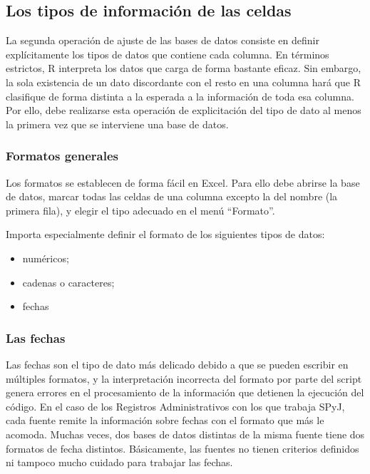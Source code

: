 \documentclass[
  spanish,
]{book}
\begin{document}
\hypertarget{los-tipos-de-informaciuxf3n-de-las-celdas}{%
\subsection{Los tipos de información de las celdas}\label{los-tipos-de-informaciuxf3n-de-las-celdas}}

La segunda operación de ajuste de las bases de datos consiste en definir explícitamente los tipos de datos que contiene cada columna. En términos estrictos, R interpreta los datos que carga de forma bastante eficaz. Sin embargo, la sola existencia de un dato discordante con el resto en una columna hará que R clasifique de forma distinta a la esperada a la información de toda esa columna. Por ello, debe realizarse esta operación de explicitación del tipo de dato al menos la primera vez que se interviene una base de datos.

\hypertarget{formatos-generales}{%
\subsubsection{Formatos generales}\label{formatos-generales}}

Los formatos se establecen de forma fácil en Excel. Para ello debe abrirse la base de datos, marcar todas las celdas de una columna excepto la del nombre (la primera fila), y elegir el tipo adecuado en el menú ``Formato''.

Importa especialmente definir el formato de los siguientes tipos de datos:

\begin{itemize}
\item
  numéricos;
\item
  cadenas o caracteres;
\item
  fechas
\end{itemize}

\hypertarget{las-fechas}{%
\subsubsection{Las fechas}\label{las-fechas}}

Las fechas son el tipo de dato más delicado debido a que se pueden escribir en múltiples formatos, y la interpretación incorrecta del formato por parte del script genera errores en el procesamiento de la información que detienen la ejecución del código. En el caso de los Registros Administrativos con los que trabaja SPyJ, cada fuente remite la información sobre fechas con el formato que más le acomoda. Muchas veces, dos bases de datos distintas de la misma fuente tiene dos formatos de fecha distintos. Básicamente, las fuentes no tienen criterios definidos ni tampoco mucho cuidado para trabajar las fechas.
\end{document}
